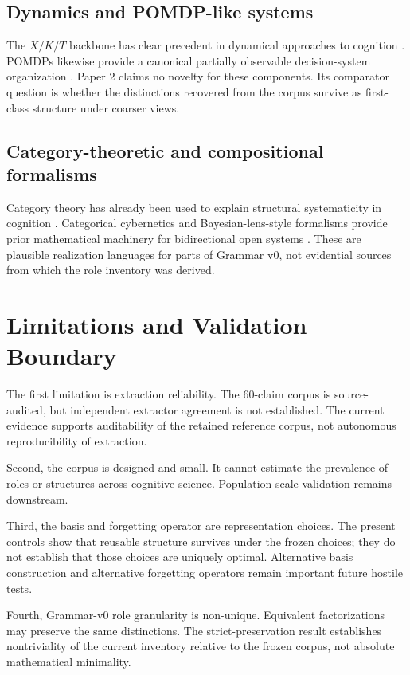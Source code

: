 \documentclass[11pt]{article}
\begin{document}
\subsection{Dynamics and POMDP-like systems}

The \(X/K/T\) backbone has clear precedent in dynamical approaches to cognition \citep{VanGelder1998DynamicalHypothesis}. POMDPs likewise provide a canonical partially observable decision-system organization \citep{KaelblingLittmanCassandra1998POMDP}. Paper 2 claims no novelty for these components. Its comparator question is whether the distinctions recovered from the corpus survive as first-class structure under coarser views.

\subsection{Category-theoretic and compositional formalisms}

Category theory has already been used to explain structural systematicity in cognition \citep{PhillipsWilson2010CategorialCompositionality}. Categorical cybernetics and Bayesian-lens-style formalisms provide prior mathematical machinery for bidirectional open systems \citep{StClereSmithe2021CyberKittens}. These are plausible realization languages for parts of Grammar v0, not evidential sources from which the role inventory was derived.


\section{Limitations and Validation Boundary}

The first limitation is extraction reliability. The 60-claim corpus is source-audited, but independent extractor agreement is not established. The current evidence supports auditability of the retained reference corpus, not autonomous reproducibility of extraction.

Second, the corpus is designed and small. It cannot estimate the prevalence of roles or structures across cognitive science. Population-scale validation remains downstream.

Third, the basis and forgetting operator are representation choices. The present controls show that reusable structure survives under the frozen choices; they do not establish that those choices are uniquely optimal. Alternative basis construction and alternative forgetting operators remain important future hostile tests.

Fourth, Grammar-v0 role granularity is non-unique. Equivalent factorizations may preserve the same distinctions. The strict-preservation result establishes nontriviality of the current inventory relative to the frozen corpus, not absolute mathematical minimality.
\end{document}
